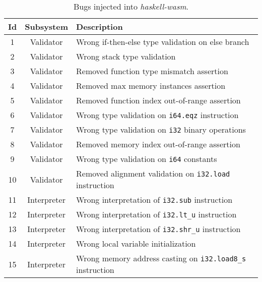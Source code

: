 \documentclass[sigconf, anonymous, review]{acmart}
\begin{document}
\begin{table}[t]
\scriptsize
\begin{tabular}{|c|c|l|}
\hline
\textbf{Id}
& \textbf{Subsystem}
& \textbf{Description} \\
\hline
1
& Validator
& Wrong if-then-else type validation on else branch \\
\hline
2
& Validator
& Wrong stack type validation \\
\hline
3
& Validator
& Removed function type mismatch assertion \\
\hline
4
& Validator
& Removed max memory instances assertion \\
\hline
5
& Validator
& Removed function index out-of-range assertion \\
\hline
6
& Validator
& Wrong type validation on \texttt{i64.eqz} instruction \\
\hline
7
& Validator
& Wrong type validation on \texttt{i32} binary operations \\
\hline
8
& Validator
& Removed memory index out-of-range assertion \\
\hline
9
& Validator
& Wrong type validation on \texttt{i64} constants \\
\hline
10
& Validator
& Removed alignment validation on \texttt{i32.load} instruction \\
\hline
11
& Interpreter
& Wrong interpretation of \texttt{i32.sub} instruction \\
\hline
12
& Interpreter
& Wrong interpretation of \texttt{i32.lt\_u} instruction \\
\hline
13
& Interpreter
& Wrong interpretation of \texttt{i32.shr\_u} instruction \\
\hline
14
& Interpreter
& Wrong local variable initialization \\
\hline
15
& Interpreter
& Wrong memory address casting on \texttt{i32.load8\_s} instruction \\
\hline
\end{tabular}
\caption{\label{table:wasm:injectedbugs}Bugs injected into
  \textit{haskell-wasm}.}
\end{table}

\end{document}
